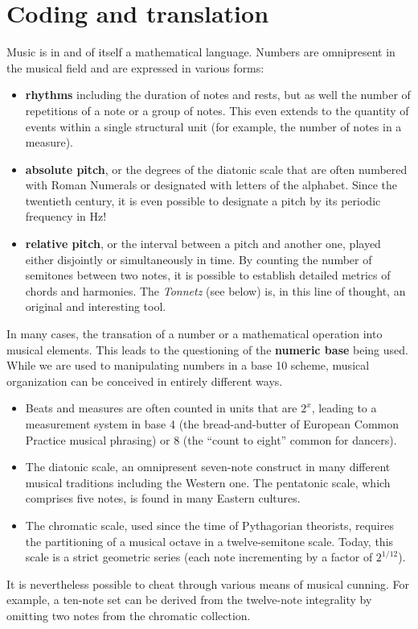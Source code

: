 \documentclass{article}
\begin{document}
\section*{Coding and translation}
Music is in and of itself a mathematical language. Numbers are omnipresent in the musical field and are expressed in various forms:

\begin{itemize}
\item \textbf{rhythms} including the duration of notes and rests, but as
well the number of repetitions of a note or a group of notes.  This even
extends to the quantity of events within a single structural unit (for
example, the number of notes in a measure).
\item \textbf{absolute pitch}, or the degrees of the diatonic scale that are
often numbered with Roman Numerals or designated with letters of the
alphabet. Since the twentieth century, it is even possible to designate a
pitch by its periodic frequency in Hz!
\item \textbf{relative pitch}, or the interval between a pitch and another
one, played either disjointly or simultaneously in time. By counting the
number of semitones between two notes, it is possible to establish detailed
metrics of chords and harmonies. The \emph{Tonnetz} (see below) is, in this
line of thought, an original and interesting tool.
\end{itemize}
In many cases, the transation of a number or a mathematical operation
into musical elements.  This leads to the questioning of the \textbf{numeric
base} being used.  While we are used to manipulating numbers in a base 10
scheme, musical organization can be conceived in entirely different ways.
\begin{itemize}
\item Beats and measures are often counted in units that are $2^x$, leading
to a measurement system in base 4 (the bread-and-butter of European Common Practice
musical phrasing) or 8 (the ``count to eight'' common for dancers).
\item The diatonic scale, an omnipresent seven-note construct in many different musical
traditions including the Western one. The pentatonic scale, which comprises
five notes, is found in many Eastern cultures.
\item The chromatic scale, used since the time of Pythagorian theorists,
requires the partitioning of a musical octave in a twelve-semitone scale.
Today, this scale is a strict geometric series (each note incrementing by a
factor of $2^{1/12}$).
\end{itemize}
It is nevertheless possible to cheat through various means of musical
cunning.  For example, a ten-note set can be derived from the twelve-note
integrality by omitting two notes from the chromatic collection.
\end{document}
